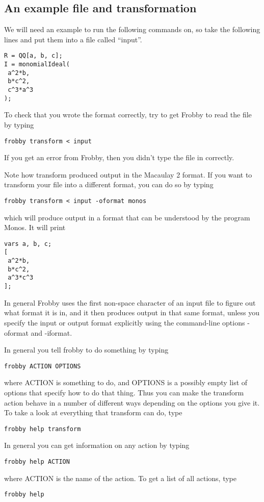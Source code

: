 \documentclass{amsart}
\theoremstyle{definition}
\begin{document}
\subsection{An example file and transformation}

We will need an example to run the following commands on, so take the
following lines and put them into a file called ``input''.
\begin{verbatim}
R = QQ[a, b, c];
I = monomialIdeal(
 a^2*b,
 b*c^2,
 c^3*a^3
);
\end{verbatim}

To check that you wrote the format correctly, try to get Frobby to
read the file by typing
\begin{verbatim}
frobby transform < input
\end{verbatim}
If you get an error from Frobby, then you didn't type the file in correctly.

Note how transform produced output in the Macaulay 2 format. If you
want to transform your file into a different format, you can do so by typing
\begin{verbatim}
frobby transform < input -oformat monos
\end{verbatim}
which will produce output in a format that can be understood by the
program Monos. It will print
\begin{verbatim}
vars a, b, c;
[
 a^2*b,
 b*c^2,
 a^3*c^3
];
\end{verbatim}
In general Frobby uses the first non-space character of an input file
to figure out what format it is in, and it then produces output in
that same format, unless you specify the input or output format
explicitly using the command-line options -oformat and -iformat.

In general you tell frobby to do something by typing
\begin{verbatim}
frobby ACTION OPTIONS
\end{verbatim}
where ACTION is something to do, and OPTIONS is a possibly empty list
of options that specify how to do that thing. Thus you can make the
transform action behave in a number of different ways depending on the
options you give it. To take a look at everything that transform can do, type
\begin{verbatim}
frobby help transform
\end{verbatim}
In general you can get information on any action by typing
\begin{verbatim}
frobby help ACTION
\end{verbatim}
where ACTION is the name of the action. To get a list of all actions,
type
\begin{verbatim}
frobby help
\end{verbatim}
\end{document}
